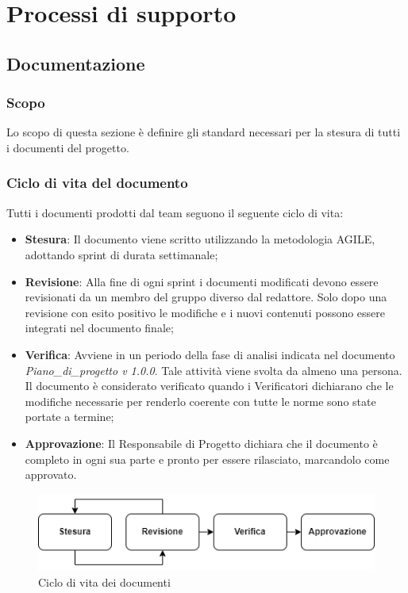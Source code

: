 \section{Processi di supporto}

\subsection{Documentazione}

\subsubsection{Scopo}
Lo scopo di questa sezione è definire gli standard necessari per la stesura di tutti i documenti del progetto.

\subsubsection{Ciclo di vita del documento}
Tutti i documenti prodotti dal team seguono il seguente ciclo di vita:
\begin{itemize}
    \item \textbf{Stesura}: Il documento viene scritto utilizzando la metodologia AGILE, adottando sprint di durata settimanale; 
    \item \textbf{Revisione}: Alla fine di ogni sprint i documenti modificati devono essere revisionati da un membro del gruppo diverso dal redattore. Solo dopo una revisione con esito positivo le modifiche e i nuovi contenuti possono essere integrati nel documento finale;
    \item \textbf{Verifica}: Avviene in un periodo della fase di analisi indicata nel documento \textit{Piano\_di\_progetto v 1.0.0}. Tale attività viene svolta da almeno una persona. Il documento è considerato verificato quando i Verificatori dichiarano che le modifiche necessarie per renderlo coerente con tutte le norme sono state portate a termine;
    \item \textbf{Approvazione}: Il Responsabile di Progetto dichiara che il documento è completo in ogni sua parte e pronto per essere rilasciato, marcandolo come approvato.
\end{itemize}
\begin{figure}[H]
    \centering
    \includegraphics[scale=0.8]{img/ciclo_di_vita.png}
    \caption{Ciclo di vita dei documenti}
\end{figure}

